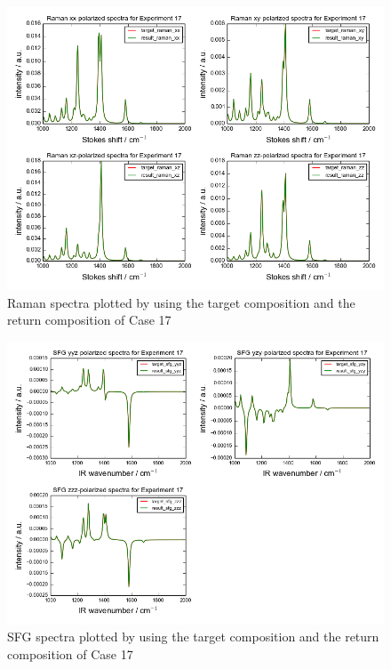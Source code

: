 \begin{figure}[!ht] 
\centering
\includegraphics[scale=0.7]{Figures/chapter4_result_target_plotting_5datapoint_raman.png}
\caption{Raman spectra plotted by using the target composition and the return composition of Case 17} \label{fig:4.3}
\end{figure}

\begin{figure}[!ht]
\centering
\includegraphics[scale=0.7]{Figures/chapter4_result_target_plotting_5datapoint_sfg.png}
\caption{SFG spectra plotted by using the target composition and the return composition of Case 17}  \label{fig:4.4}
\end{figure}

